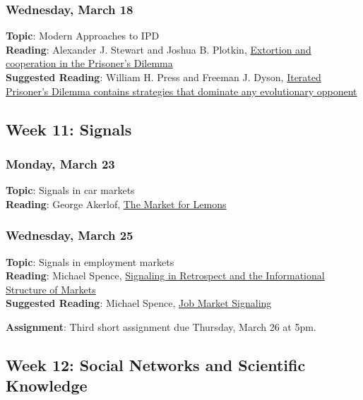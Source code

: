\documentclass[
  letterpaper,
  DIV=11,
  numbers=noendperiod]{scrartcl}
\begin{document}
\subsubsection{Wednesday, March 18}\label{wednesday-march-18}

\textbf{Topic}: Modern Approaches to IPD\\
\textbf{Reading}: Alexander J. Stewart and Joshua B. Plotkin,
\href{https://www.pnas.org/doi/10.1073/pnas.1208087109}{Extortion and
cooperation in the Prisoner's Dilemma}\\
\textbf{Suggested Reading}: William H. Press and Freeman J. Dyson,
\href{https://www.pnas.org/doi/abs/10.1073/pnas.1206569109}{Iterated
Prisoner's Dilemma contains strategies that dominate any evolutionary
opponent}

\subsection{Week 11: Signals}\label{week-11-signals}

\subsubsection{Monday, March 23}\label{monday-march-23}

\textbf{Topic}: Signals in car markets\\
\textbf{Reading}: George Akerlof,
\href{https://www.jstor.org/stable/1879431}{The Market for Lemons}

\subsubsection{Wednesday, March 25}\label{wednesday-march-25}

\textbf{Topic}: Signals in employment markets\\
\textbf{Reading}: Michael Spence,
\href{https://www.nobelprize.org/uploads/2018/06/spence-lecture.pdf}{Signaling
in Retrospect and the Informational Structure of Markets}\\
\textbf{Suggested Reading}: Michael Spence,
\href{https://www.jstor.org/stable/1882010}{Job Market Signaling}

\textbf{Assignment}: Third short assignment due Thursday, March 26 at
5pm.

\subsection{Week 12: Social Networks and Scientific
Knowledge}\label{week-12-social-networks-and-scientific-knowledge}
\end{document}
